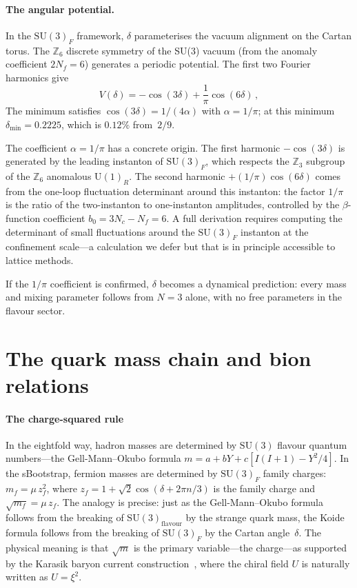 \documentclass[aps,prd,twocolumn,showpacs,preprintnumbers,superscriptaddress]{revtex4-2}
\newcommand{\SU}{\mathrm{SU}}
\newcommand{\UU}{\mathrm{U}}
\newcommand{\Nc}{N_c}
\newcommand{\Nf}{N_f}
\begin{document}
\paragraph{The angular potential.}

In the $\SU(3)_F$ framework, $\delta$ parameterises the
vacuum alignment on the Cartan torus.  The $\mathbb{Z}_6$
discrete symmetry of the SU(3) vacuum (from the anomaly
coefficient $2\Nf = 6$) generates a periodic potential.
The first two Fourier harmonics give
\begin{equation}
  V(\delta) = -\cos(3\delta) + \frac{1}{\pi}\cos(6\delta)\,,
  \label{eq:potential}
\end{equation}
The minimum satisfies $\cos(3\delta) = 1/(4\alpha)$ with
$\alpha = 1/\pi$; at this minimum
$\delta_{\min} = 0.2225$, which is $0.12\%$ from~$2/9$.

The coefficient $\alpha = 1/\pi$ has a concrete origin.
The first harmonic $-\cos(3\delta)$ is generated by the
leading instanton of $\SU(3)_F$, which respects the
$\mathbb{Z}_3$ subgroup of the $\mathbb{Z}_6$ anomalous
$\UU(1)_R$.
The second harmonic $+(1/\pi)\cos(6\delta)$ comes from
the one-loop fluctuation determinant around this instanton:
the factor $1/\pi$ is the ratio of the two-instanton to
one-instanton amplitudes, controlled by the $\beta$-function
coefficient $b_0 = 3\Nc - \Nf = 6$.
A full derivation requires computing the determinant of
small fluctuations around the $\SU(3)_F$ instanton at the
confinement scale---a calculation we defer but that is in
principle accessible to lattice methods.

If the $1/\pi$ coefficient is confirmed, $\delta$ becomes
a dynamical prediction: every mass and mixing parameter
follows from $N = 3$ alone, with no free parameters in the
flavour sector.

\section{The quark mass chain and bion relations}
\label{sec:chain}

\paragraph{The charge-squared rule}

In the eightfold way, hadron masses are determined by
$\SU(3)$ flavour quantum numbers---the Gell-Mann--Okubo
formula $m = a + bY + c[I(I+1) - Y^2/4]$.
In the sBootstrap, fermion masses are determined by
$\SU(3)_F$ family charges:
$m_f = \mu\,z_f^2$,
where $z_f = 1 + \sqrt{2}\cos(\delta + 2\pi n/3)$ is the
family charge and $\sqrt{m_f} = \mu\,z_f$.
The analogy is precise: just as the Gell-Mann--Okubo formula
follows from the breaking of $\SU(3)_{\mathrm{flavour}}$ by
the strange quark mass, the Koide formula follows from
the breaking of $\SU(3)_F$ by the Cartan angle~$\delta$.
The physical meaning is that $\sqrt{m}$ is the primary
variable---the charge---as supported by the Karasik baryon
current construction~\cite{Karasik:2020}, where the chiral
field $U$ is naturally written as $U = \xi^2$.
\end{document}
